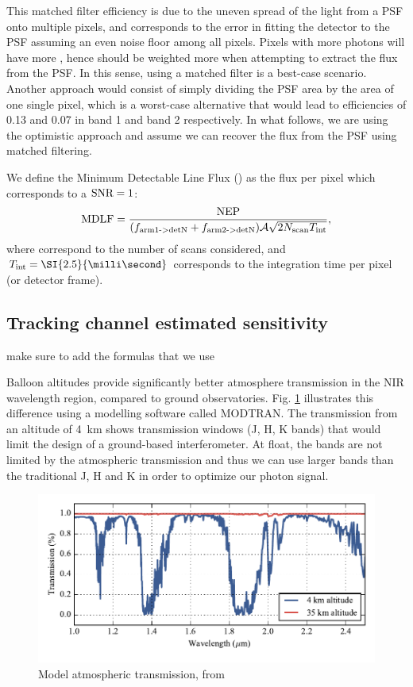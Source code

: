 This matched filter efficiency is due to the uneven spread of the light from a PSF onto multiple pixels, and corresponds to the error in fitting the detector to the PSF assuming an even noise floor among all pixels. Pixels with more photons will have more \SNR, hence should be weighted more when attempting to extract the flux from the PSF. In this sense, using a matched filter is a best-case scenario. Another approach would consist of simply dividing the PSF area by the area of one single pixel, which is a worst-case alternative that would lead to efficiencies of 0.13 and 0.07 in band 1 and band 2 respectively. In what follows, we are using the optimistic approach and assume we can recover the flux from the PSF using matched filtering. 

We define the Minimum Detectable Line Flux (\MDLF) as the flux per pixel which corresponds to a $\textrm{SNR} = 1$:
\begin{align}
\textrm{MDLF} = \frac{\textrm{NEP}}{(f_\textrm{arm1->detN}+ f_\textrm{arm2->detN})\mathcal{A}\sqrt{2N_\textrm{scan}T_\textrm{int}}},
\end{align}
where \Nscan correspond to the number of scans considered, and $\Tint = \SI{2.5}{\milli\second}$ corresponds to the integration time per pixel (or detector frame). 

\subsection{Tracking channel estimated sensitivity}
make sure to add the formulas that we use

Balloon altitudes provide significantly better atmosphere transmission in the NIR wavelength region, compared to ground observatories. Fig. \ref{fig:trans} illustrates this difference using a modelling software called MODTRAN. The transmission from an altitude of 4~km shows transmission windows (J, H, K bands) that would limit the design of a ground-based interferometer. At float, the bands are not limited by the atmospheric transmission and thus we can use larger bands than the traditional J, H and K in order to optimize our photon signal.

\begin{figure}[ht!]
\begin{center}
\includegraphics[width=\textwidth]{Figures/BETTII_atmo_transmission.pdf}
\caption{Model atmospheric transmission, from \cite{Rizzo:2012jp}}
\label{fig:trans}
\end{center}
\end{figure}



